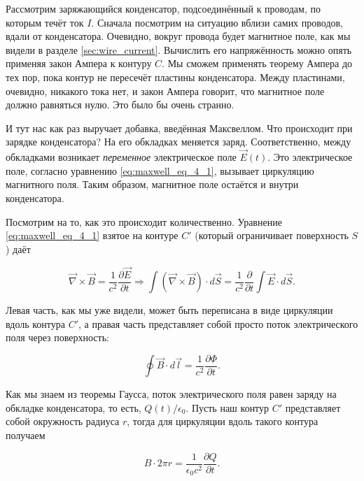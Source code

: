 \documentclass[a4paper,12pt]{article}
\numberwithin{equation}{section}
\newcommand{\pt}{\partial}
\newcommand{\eps}{\epsilon}
\newcommand{\vn}{\vec{\nabla}}
\begin{document}
Рассмотрим заряжающийся конденсатор, подсоединённый к проводам, по
которым течёт ток $I$. Сначала посмотрим на ситуацию вблизи самих
проводов, вдали от конденсатора. Очевидно, вокруг провода будет
магнитное поле, как мы видели в разделе
\ref{sec:wire_current}. Вычислить его напряжённость можно опять
применяя закон Ампера к контуру $C$. Мы сможем применять теорему
Ампера до тех пор, пока контур не пересечёт пластины
конденсатора. Между пластинами, очевидно, никакого тока нет, и закон
Ампера говорит, что магнитное поле должно равняться нулю. Это было бы
очень странно.

И тут нас как раз выручает добавка, введённая
Максвеллом. Что происходит при зарядке конденсатора? На его обкладках
меняется заряд. Соответственно, между обкладками возникает
\textit{переменное} электрическое поле $\vec{E}(t)$. Это электрическое
поле, согласно уравнению \eqref{eq:maxwell_eq_4_1}, вызывает
циркуляцию магнитного поля. Таким образом, магнитное поле остаётся и
внутри конденсатора. 

Посмотрим на то, как это происходит количественно. Уравнение
\eqref{eq:maxwell_eq_4_1} взятое на контуре $C'$ (который ограничивает
поверхность $S$) даёт

\begin{equation}
  \label{eq:displacement_cur_1}
  \vn \times \vec{B} = \frac{1}{c^2} \frac{\pt \vec{E}}{\pt t}
  \Rightarrow \int \left( \vn \times \vec{B}  \right)  \cdot d \vec{S}
  = \frac{1}{c^2} \frac{\pt}{\pt t} \int \vec{E} \cdot d \vec{S}.
\end{equation}

Левая часть, как мы уже видели, может быть переписана в виде
циркуляции вдоль контура $C'$, а правая часть представляет собой
просто поток электрического поля через поверхность: 

\begin{equation}
  \label{eq:displacement_cur_2}
  \oint \vec{B} \cdot d \vec{l} = \frac{1}{c^2} \frac{\pt \Phi}{\pt t}.
\end{equation}

Как мы знаем из теоремы Гаусса, поток электрического поля равен заряду
на обкладке конденсатора, то есть, $Q(t)/\eps_0$. Пусть наш контур
$C'$ представляет собой окружность радиуса $r$, тогда для циркуляции
вдоль такого контура получаем

\begin{equation}
  \label{eq:displacement_cur_3}
  B \cdot 2 \pi r = \frac{1}{\eps_0c^2} \frac{\pt Q}{\pt t}. 
\end{equation}
\end{document}
